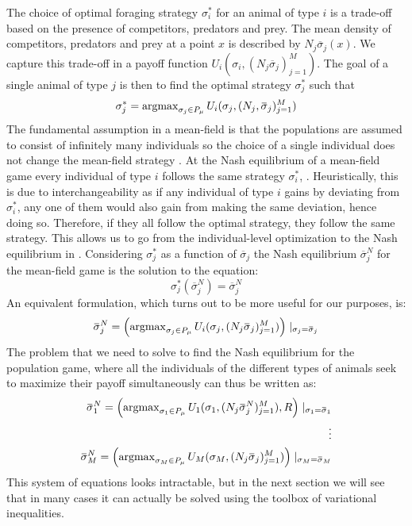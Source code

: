 The choice of optimal foraging strategy $\sigma_i^*$ for an animal of type $i$ is a trade-off based on the presence of competitors, predators and prey. The mean density of competitors, predators and prey at a point $x$ is described by $N_j \overbar{\sigma}_j(x)$. We capture this trade-off in a payoff function $U_i(\sigma_i, (N_j \overbar{\sigma}_j)_{j=1}^M)$. The goal of a single animal of type $j$ is then to find the optimal strategy $\sigma_j^*$ such that
\begin{equation}
  \label{eq:ind_opt}
  \sigma^*_j = \argmax_{\sigma_j \in P_{\mu}} U_i(\sigma_j, (N_j, \overbar{\sigma}_j)_{j=1}^M)
\end{equation}
The fundamental assumption in a mean-field is that the populations are assumed to consist of infinitely many individuals so the choice of a single individual does not change the mean-field strategy \citep{aumann1964markets}. At the Nash equilibrium of a mean-field game every individual of type $i$ follows the same strategy $\sigma_i^*$, \citep{lasry2007mean}. Heuristically, this is due to interchangeability as if any individual of type $i$ gains by deviating from $\sigma_i^*$, any one of them would also gain from making the same deviation, hence doing so. Therefore, if they all follow the optimal strategy, they follow the same strategy. This allows us to go from the individual-level optimization to the Nash equilibrium in . Considering $\sigma^*_{j}$ as a function of $\overbar{\sigma}_j$ the Nash equilibrium $\overbar{\sigma}_j^N$ for the mean-field game is the solution to the equation:
\begin{equation}
  \sigma^*_{j}(\overbar{\sigma}^N_j) = \overbar{\sigma}^N_j
\end{equation}
An equivalent formulation, which turns out to be more useful for our purposes, is:
\begin{equation}
  \label{eq:mfg_ne}
  \overbar{\sigma}_j^N = \pa{\argmax_{\sigma_j \in P_{\mu}} U_i(\sigma_j, (N_j \overbar{\sigma}_j)_{j=1}^M) } \mid_{\sigma_j = \overbar{\sigma}_j}
\end{equation}
The problem that we need to solve to find the Nash equilibrium for the population game, where all the individuals of the different types of animals seek to maximize their payoff simultaneously can thus be written as:
\begin{equation}
  \label{eq:tot_nash_eq}
  \begin{split}
    \overbar{\sigma}_1^N = \pa{\argmax_{\sigma_1 \in P_{\mu}} U_1(\sigma_1, (N_j \overbar{\sigma}^N_j)_{j=1}^M), R } \mid_{\sigma_1 = \overbar{\sigma}_1} \\
    \vdots \\
    \overbar{\sigma}_M^N = \pa{\argmax_{\sigma_M \in P_{\mu}} U_M(\sigma_M, (N_j \overbar{\sigma}_j)_{j=1}^M) } \mid_{\sigma_M = \overbar{\sigma}_M}
    \end{split}
\end{equation}
This system of equations looks intractable, but in the next section we will see that in many cases it can actually be solved using the toolbox of variational inequalities.



